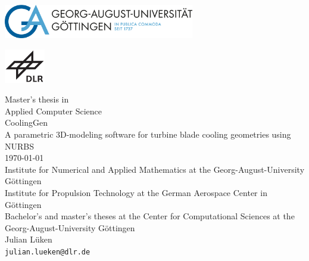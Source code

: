 \documentclass[a4paper, 11pt]{report}
\newcommand{\mytitle}[1]{\LARGE{#1}\normalsize\\[0.3em]}
\newcommand{\titlespace}{\vspace{2em}}
\newcommand{\hugespace}{\vspace{17em}}
\newcommand{\logoheight}{4em}
\theoremstyle{definition}
\begin{document}
\begin{titlepage}
	\begin{center}
		\begin{minipage}{.49\textwidth}
			\flushleft
			\includegraphics[height=\logoheight]{../assets/formal/logo_gau.png}
		\end{minipage}
		\begin{minipage}{.49\textwidth}
			\flushright
			\includegraphics[height=\logoheight]{../assets/formal/logo_dlr.png}	
		\end{minipage}
		\begin{minipage}{.49\textwidth}
			\begin{center}
				\vspace{2cm}
				Master's thesis in\\
				Applied Computer Science\\
				\titlespace
				\mytitle{CoolingGen}
				A parametric 3D-modeling software for turbine blade cooling geometries using NURBS\\
				\titlespace
				\today\\
				\hugespace
				Institute for Numerical and Applied Mathematics at the Georg-August-University Göttingen\\
				\titlespace
				Institute for Propulsion Technology at the German Aerospace Center in Göttingen\\
				\titlespace
				Bachelor's and master's theses at the Center for Computational Sciences at the Georg-August-University Göttingen\\
				\titlespace
				Julian Lüken\\
				\texttt{julian.lueken@dlr.de}\\
			\end{center}
		\end{minipage}
	\end{center}
\end{titlepage}
\end{document}
